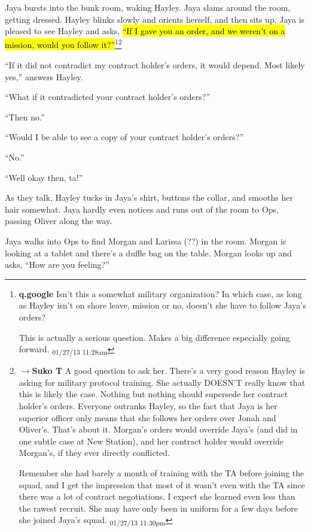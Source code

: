 Jaya bursts into the bunk room, waking Hayley.  Jaya slams around the room, getting dressed.  Hayley blinks slowly and orients herself, and then sits up.  Jaya is pleased to see Hayley and asks, \hl{``If I gave you an order, and we weren't on a mission, would you follow it?''}\footnote{\textbf{q.google }Isn't this a somewhat military organization?  In which case, as long as Hayley isn't on shore leave, mission or no, doesn't she have to follow Jaya's orders?

This is actually a serious question.  Makes a big difference especially going forward. \textsubscript{01/27/13 11:28am}}\footnote{$\rightarrow$\textbf{Suko T }A good question to ask her. There's a very good reason Hayley is asking for military protocol training.  She actually DOESN'T really know that this is likely the case.  Nothing but nothing should supersede her contract holder's orders.  Everyone outranks Hayley, so the fact that Jaya is her superior officer only means that she follows her orders over Jonah and Oliver's.  That's about it.  Morgan's orders would override Jaya's (and did in one subtle case at New Station), and her contract holder would override Morgan's, if they ever directly conflicted.

Remember she had barely a month of training with the TA before joining the squad, and I get the impression that most of it wasn't even with the TA since there was a lot of contract negotiations.  I expect she learned even less than the rawest recruit.  She may have only been in uniform for a few days before she joined Jaya's squad. \textsubscript{01/27/13 11:30pm}}

``If it did not contradict my contract holder's orders, it would depend.  Most likely yes,'' answers Hayley.

``What if it contradicted your contract holder's orders?''

``Then no.''

``Would I be able to see a copy of your contract holder's orders?''

``No.''

``Well okay then, ta!''



As they talk, Hayley tucks in Jaya's shirt, buttons the collar, and smooths her hair somewhat.  Jaya hardly even notices and runs out of the room to Ops, passing Oliver along the way.



Jaya walks into Ops to find Morgan and Larissa (??) in the room.  Morgan is looking at a tablet and there's a duffle bag on the table.  Morgan looks up and asks, ``How are you feeling?''


